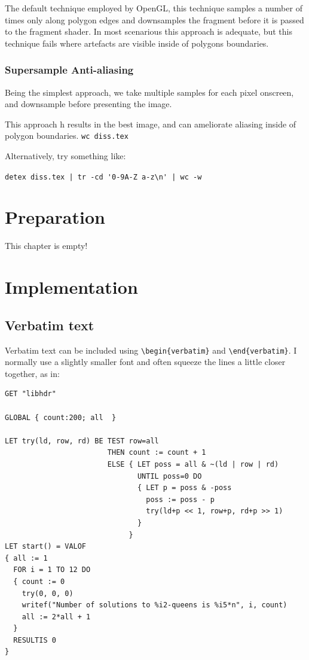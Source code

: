 \documentclass[12pt,a4paper,twoside,openright]{report}
\renewcommand{\baselinestretch}{1.1}    %
\begin{document}
The default technique employed by OpenGL, this technique samples a number of times only along polygon edges and downsamples the fragment before it is passed to the fragment shader. In most scenarious this approach is adequate, but this technique fails where artefacts are visible inside of polygons boundaries.

\subsection{Supersample Anti-aliasing}

Being the simplest approach, we take multiple samples for each pixel onscreen, and downsample before presenting the image.

This approach h results in the best image, and can ameliorate aliasing inside of polygon boundaries.
\texttt{wc diss.tex}

\noindent
Alternatively, try something like:

\verb/detex diss.tex | tr -cd '0-9A-Z a-z\n' | wc -w/


\chapter{Preparation}

This chapter is empty!


\chapter{Implementation}

\section{Verbatim text}

Verbatim text can be included using \verb|\begin{verbatim}| and
\verb|\end{verbatim}|. I normally use a slightly smaller font and
often squeeze the lines a little closer together, as in:

{\renewcommand{\baselinestretch}{0.8}\small
\begin{verbatim}
GET "libhdr"
 
GLOBAL { count:200; all  }
 
LET try(ld, row, rd) BE TEST row=all
                        THEN count := count + 1
                        ELSE { LET poss = all & ~(ld | row | rd)
                               UNTIL poss=0 DO
                               { LET p = poss & -poss
                                 poss := poss - p
                                 try(ld+p << 1, row+p, rd+p >> 1)
                               }
                             }
LET start() = VALOF
{ all := 1
  FOR i = 1 TO 12 DO
  { count := 0
    try(0, 0, 0)
    writef("Number of solutions to %i2-queens is %i5*n", i, count)
    all := 2*all + 1
  }
  RESULTIS 0
}
\end{verbatim}
}
\end{document}
